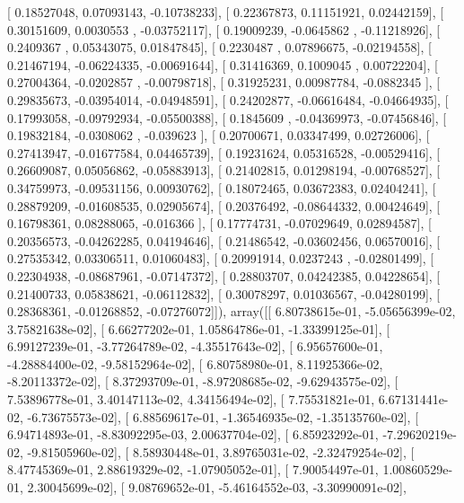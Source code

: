 \documentclass{article}
\begin{document}
       [ 0.18527048,  0.07093143, -0.10738233],
       [ 0.22367873,  0.11151921,  0.02442159],
       [ 0.30151609,  0.0030553 , -0.03752117],
       [ 0.19009239, -0.0645862 , -0.11218926],
       [ 0.2409367 ,  0.05343075,  0.01847845],
       [ 0.2230487 ,  0.07896675, -0.02194558],
       [ 0.21467194, -0.06224335, -0.00691644],
       [ 0.31416369,  0.1009045 ,  0.00722204],
       [ 0.27004364, -0.0202857 , -0.00798718],
       [ 0.31925231,  0.00987784, -0.0882345 ],
       [ 0.29835673, -0.03954014, -0.04948591],
       [ 0.24202877, -0.06616484, -0.04664935],
       [ 0.17993058, -0.09792934, -0.05500388],
       [ 0.1845609 , -0.04369973, -0.07456846],
       [ 0.19832184, -0.0308062 , -0.039623  ],
       [ 0.20700671,  0.03347499,  0.02726006],
       [ 0.27413947, -0.01677584,  0.04465739],
       [ 0.19231624,  0.05316528, -0.00529416],
       [ 0.26609087,  0.05056862, -0.05883913],
       [ 0.21402815,  0.01298194, -0.00768527],
       [ 0.34759973, -0.09531156,  0.00930762],
       [ 0.18072465,  0.03672383,  0.02404241],
       [ 0.28879209, -0.01608535,  0.02905674],
       [ 0.20376492, -0.08644332,  0.00424649],
       [ 0.16798361,  0.08288065, -0.016366  ],
       [ 0.17774731, -0.07029649,  0.02894587],
       [ 0.20356573, -0.04262285,  0.04194646],
       [ 0.21486542, -0.03602456,  0.06570016],
       [ 0.27535342,  0.03306511,  0.01060483],
       [ 0.20991914,  0.0237243 , -0.02801499],
       [ 0.22304938, -0.08687961, -0.07147372],
       [ 0.28803707,  0.04242385,  0.04228654],
       [ 0.21400733,  0.05838621, -0.06112832],
       [ 0.30078297,  0.01036567, -0.04280199],
       [ 0.28368361, -0.01268852, -0.07276072]]), array([[  6.80738615e-01,  -5.05656399e-02,   3.75821638e-02],
       [  6.66277202e-01,   1.05864786e-01,  -1.33399125e-01],
       [  6.99127239e-01,  -3.77264789e-02,  -4.35517643e-02],
       [  6.95657600e-01,  -4.28884400e-02,  -9.58152964e-02],
       [  6.80758980e-01,   8.11925366e-02,  -8.20113372e-02],
       [  8.37293709e-01,  -8.97208685e-02,  -9.62943575e-02],
       [  7.53896778e-01,   3.40147113e-02,   4.34156494e-02],
       [  7.75531821e-01,   6.67131441e-02,  -6.73675573e-02],
       [  6.88569617e-01,  -1.36546935e-02,  -1.35135760e-02],
       [  6.94714893e-01,  -8.83092295e-03,   2.00637704e-02],
       [  6.85923292e-01,  -7.29620219e-02,  -9.81505960e-02],
       [  8.58930448e-01,   3.89765031e-02,  -2.32479254e-02],
       [  8.47745369e-01,   2.88619329e-02,  -1.07905052e-01],
       [  7.90054497e-01,   1.00860529e-01,   2.30045699e-02],
       [  9.08769652e-01,  -5.46164552e-03,  -3.30990091e-02],
\end{document}
